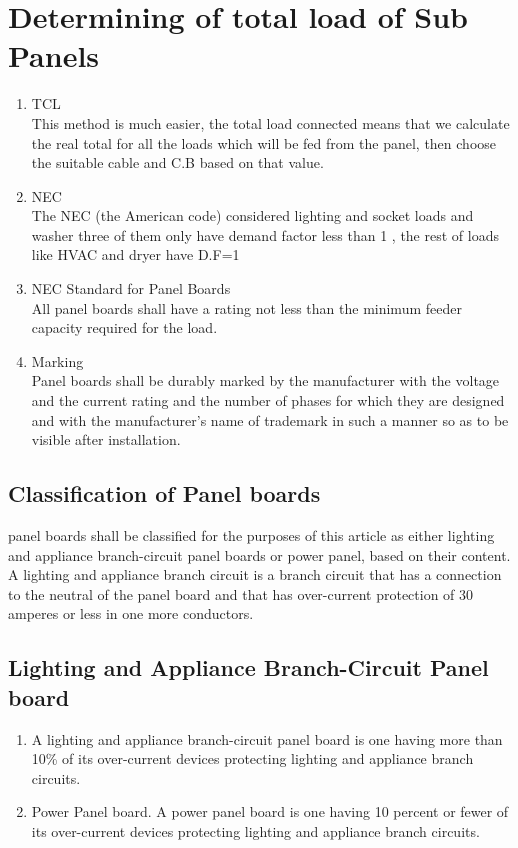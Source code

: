 \documentclass[12pt,fleqn]{book} %
\begin{document}
\section {Determining of total load of Sub Panels}
\begin{enumerate}
\item TCL
\\ This method is much easier, the total load connected means that we calculate the real total for all the loads which will be fed from the panel, then choose the suitable cable and C.B based on that value.
\item NEC
\\ The NEC (the American code) considered lighting and socket loads and washer three of them only have demand factor less than 1 , the rest of loads like HVAC and dryer have D.F=1
\item NEC Standard for Panel Boards
\\ All panel boards shall have a rating not less than the minimum feeder capacity required for the load.
\item Marking
\\Panel boards shall be durably marked by the manufacturer with the voltage and the current rating and the number of phases for which they are designed and with the manufacturer's name of trademark in such a manner so as to be visible after installation.
\end{enumerate}
\subsection{Classification of Panel boards}
panel boards shall be classified for the purposes of this article as either lighting and appliance branch-circuit panel boards or power panel, based on their content. A lighting and appliance branch circuit is a branch circuit that has a connection to the neutral of the panel board and that has over-current protection of 30 amperes or less in one more conductors.
\subsection{Lighting and Appliance Branch-Circuit Panel board}
\begin{enumerate}
    \item A lighting and appliance branch-circuit panel board is one having more than 10\% of its over-current devices protecting lighting and appliance branch circuits.
    \item Power Panel board. A power panel board is one having 10 percent or fewer of its over-current devices protecting lighting and appliance branch circuits.
\end{enumerate}
\end{document}
